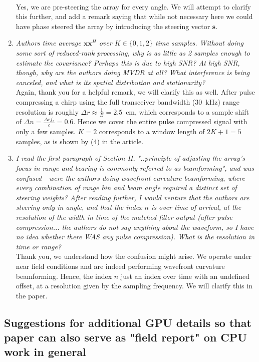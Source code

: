 \documentclass[11pt]{article} %
\renewcommand\H{^{\scriptscriptstyle H}}
\renewcommand\vec[1]{\boldsymbol{#1}}
\newcommand\1{\vec 1}
\newcommand*\x{\vec x}
\newcommand\q[1]{\textit{#1}}
\newcommand\qi[1]{\item\q{#1}}
\newcommand\ans[1]{#1}
\newcommand\ai[1]{\\[.5\baselineskip]\ans{#1}}
\begin{document}
\begin{enumerate}
\ai{Yes, we are pre-steering the array for every angle. We will attempt to clarify this further, and add a remark saying that while not necessary here we could have phase steered the array by introducing the steering vector $\vec s$.}
%
\qi{Authors time average $\x\x\H$ over $K\in\{0, 1, 2\}$ time samples. Without doing some sort of reduced-rank processing, why is as little as 2 samples enough to estimate the covariance? Perhaps this is due to high SNR? At high SNR, though, why are the authors doing MVDR at all? What interference is being canceled, and what is its spatial distribution and stationarity? }
\ai{Again, thank you for a helpful remark, we will clarify this as well. After pulse compressing a chirp using the full transceiver bandwidth (30~kHz) range resolution is roughly $\Delta r \approx \frac{1}{B} = 2.5$~cm, which corresponds to a sample shift of $\Delta n = \frac{\Delta r f_s}{c} = 0.6$. Hence we cover the entire pulse compressed signal with only a few samples. $K=2$ corresponds to a window length of $2K+1=5$ samples, as is shown by (4) in the article.} 
%
\qi{I read the first paragraph of Section II, "..principle of adjusting the array's focus in range and bearing is commonly referred to as beamforming", and was confused - were the authors doing wavefront curvature beamforming, where every combination of range bin and beam angle required a distinct set of steering weights? After reading further, I would venture that the authors are steering only in angle, and that the index $n$ is over time of arrival, at the resolution of the width in time of the matched filter output (after pulse compression... the authors do not say anything about the waveform, so I have no idea whether there WAS any pulse compression). What is the resolution in time or range? }
\ai{Thank you, we understand how the confusion might arise. We operate under near field conditions and are indeed performing wavefront curvature beamforming. Hence, the index $n$ just an index over time with an undefined offset, at a resolution given by the sampling frequency. We will clarify this in the paper.}
\end{enumerate}


\subsection{Suggestions for additional GPU details so that paper can also serve as "field report" on CPU work in general}
\end{document}
